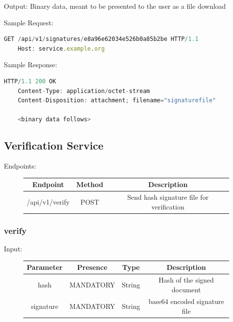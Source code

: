 Output: Binary data, meant to be presented to the user as a file download


Sample Request:

\begin{lstlisting}[caption={signature request}, captionpos=b, language=JavaScript, label={lst:signaturerequest}]
    GET /api/v1/signatures/e8a96e62034e526b0a85b2be HTTP/1.1
    Host: service.example.org
\end{lstlisting}

Sample Response:

\begin{lstlisting}[caption={signature response}, captionpos=b, language=JavaScript, label={lst:signatureresponse}]
    HTTP/1.1 200 OK
    Content-Type: application/octet-stream
    Content-Disposition: attachment; filename="signaturefile"

    <binary data follows>
\end{lstlisting}

\subsection{Verification Service}\label{subsec:verification-service}
Endpoints:

\begin{figure}[H]
    \begin{center}
        \begin{tabular}{c|c|c}
            \textbf{Endpoint} & \textbf{Method} & \textbf{Description} \\
            \hline
            /api/v1/verify & POST & Send hash signature file for verification \\
        \end{tabular}
    \end{center}
\end{figure}

\subsubsection{verify}
Input:

\begin{figure}[H]
    \begin{center}
        \begin{tabular}{c|c|c|c}
            \textbf{Parameter} & \textbf{Presence} & \textbf{Type} & \textbf{Description} \\
            \hline
            hash & MANDATORY & String & Hash of the signed document \\
            \hline
            signature & MANDATORY & String & base64 encoded signature file \\
        \end{tabular}
    \end{center}
\end{figure}

